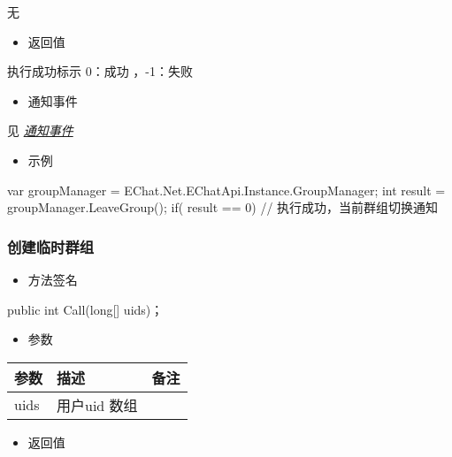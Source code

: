 \documentclass[letterpaper,10pt,english]{sphinxmanual}
\begin{document}
无
\begin{itemize}
\item {} 
返回值

\end{itemize}

执行成功标示 0：成功 ，-1：失败
\begin{itemize}
\item {} 
通知事件

\end{itemize}

见 {\hyperref[\detokenize{csharp:groupEvent}]{\emph{通知事件}}}
\begin{itemize}
\item {} 
示例

\end{itemize}

%
\begin{sphinxVerbatim}[commandchars=\\\{\}]
var groupManager = EChat.Net.EChatApi.Instance.GroupManager;
int result = groupManager.LeaveGroup();
if( result == 0)\PYGZob{}
  // 执行成功，当前群组切换通知
\PYGZcb{}
\end{sphinxVerbatim}


\subsubsection{创建临时群组}
\label{\detokenize{csharp:id37}}\begin{itemize}
\item {} 
方法签名

\end{itemize}

%
\begin{sphinxVerbatim}[commandchars=\\\{\}]
public int Call(long[] uids)；
\end{sphinxVerbatim}
\begin{itemize}
\item {} 
参数

\end{itemize}


\begin{savenotes}\sphinxattablestart
\centering
\begin{tabulary}{\linewidth}[t]{|T|T|T|}
\hline
\sphinxstyletheadfamily 
参数
&\sphinxstyletheadfamily 
描述
&\sphinxstyletheadfamily 
备注
\\
\hline
uids
&
用户uid 数组
&\\
\hline
\end{tabulary}
\par
\sphinxattableend\end{savenotes}
\begin{itemize}
\item {} 
返回值

\end{itemize}
\end{document}
